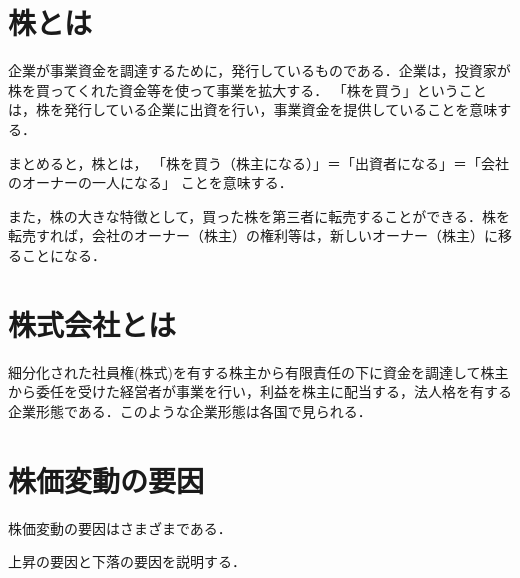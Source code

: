 \section{株とは}
企業が事業資金を調達するために，発行しているものである．企業は，投資家が株を買ってくれた資金等を使って事業を拡大する．
「株を買う」ということは，株を発行している企業に出資を行い，事業資金を提供していることを意味する．

まとめると，株とは，
「株を買う（株主になる）」＝「出資者になる」＝「会社のオーナーの一人になる」
ことを意味する\cite{kaisya}．

また，株の大きな特徴として，買った株を第三者に転売することができる．株を転売すれば，会社のオーナー（株主）の権利等は，新しいオーナー（株主）に移ることになる\cite{kabu}．

\section{株式会社とは}
細分化された社員権(株式)を有する株主から有限責任の下に資金を調達して株主から委任を受けた経営者が事業を行い，利益を株主に配当する，法人格を有する企業形態である．このような企業形態は各国で見られる．

\section{株価変動の要因}
株価変動の要因はさまざまである．

上昇の要因と下落の要因を説明する．

